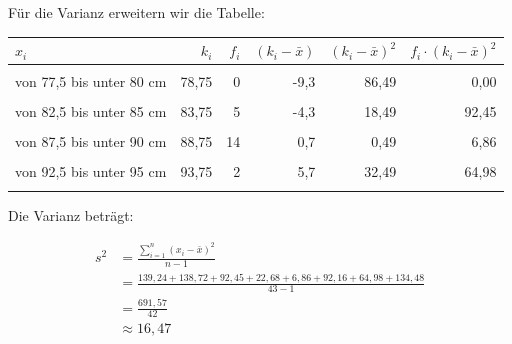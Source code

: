 \documentclass[
  11pt,
  ngerman,
  a4paper,
]{report}
\begin{document}
Für die Varianz erweitern wir die Tabelle:

\begin{table}[H]
\centering
\begin{tabular}{>{\raggedright\arraybackslash}p{8cm}rrrrr}
\toprule
\textbf{$x_i$} & \textbf{$k_i$} & \textbf{$f_i$} & \textbf{$(k_i - \bar{x})$} & \textbf{$(k_i - \bar{x})^2$} & \textbf{$f_i \cdot (k_i - \bar{x})^2$}\\
\midrule
\cellcolor{gray!6}{von 75 bis unter 77,5 cm} & \cellcolor{gray!6}{76,25} & \cellcolor{gray!6}{1} & \cellcolor{gray!6}{-11,8} & \cellcolor{gray!6}{139,24} & \cellcolor{gray!6}{139,24}\\
von 77,5 bis unter 80 cm & 78,75 & 0 & -9,3 & 86,49 & 0,00\\
\cellcolor{gray!6}{von 80 bis unter 82,5 cm} & \cellcolor{gray!6}{81,25} & \cellcolor{gray!6}{3} & \cellcolor{gray!6}{-6,8} & \cellcolor{gray!6}{46,24} & \cellcolor{gray!6}{138,72}\\
von 82,5 bis unter 85 cm & 83,75 & 5 & -4,3 & 18,49 & 92,45\\
\cellcolor{gray!6}{von 85 bis unter 87,5 cm} & \cellcolor{gray!6}{86,25} & \cellcolor{gray!6}{7} & \cellcolor{gray!6}{-1,8} & \cellcolor{gray!6}{3,24} & \cellcolor{gray!6}{22,68}\\
von 87,5 bis unter 90 cm & 88,75 & 14 & 0,7 & 0,49 & 6,86\\
\cellcolor{gray!6}{von 90 bis unter 92,5 cm} & \cellcolor{gray!6}{91,25} & \cellcolor{gray!6}{9} & \cellcolor{gray!6}{3,2} & \cellcolor{gray!6}{10,24} & \cellcolor{gray!6}{92,16}\\
von 92,5 bis unter 95 cm & 93,75 & 2 & 5,7 & 32,49 & 64,98\\
\cellcolor{gray!6}{von 95 bis unter 97,5 cm} & \cellcolor{gray!6}{96,25} & \cellcolor{gray!6}{2} & \cellcolor{gray!6}{8,2} & \cellcolor{gray!6}{67,24} & \cellcolor{gray!6}{134,48}\\
\bottomrule
\end{tabular}
\end{table}

Die Varianz beträgt:

\[\begin{aligned}
  s^2&=\frac{\sum\limits_{i=1}^{n}(x_{i}-\bar{x})^2}{n-1} \\
     &=\frac{139{,}24+138{,}72+ 92{,}45+ 22{,}68+  6{,}86+ 92{,}16+ 64{,}98+134{,}48}{43-1}\\
     &=\frac{691{,}57}{42}\\
     &\approx{16{,}47}
\end{aligned}\]
\end{document}
